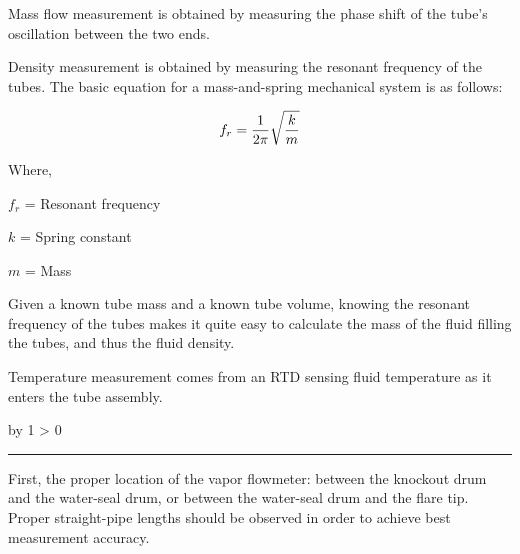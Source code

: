 \documentclass[12pt,a4paper]{article}
\def\svar{
           \advance\answnum by 1
           \ifnum \answnum > 0
                \hrule
                \vskip 3pt
                \leftline{Svar \the\answnum}
                \vskip 3pt \fi}
\begin{document}
\vskip 10pt

Mass flow measurement is obtained by measuring the phase shift of the tube's oscillation between the two ends.  

Density measurement is obtained by measuring the resonant frequency of the tubes.  The basic equation for a mass-and-spring mechanical system is as follows:

$$f_r = {1 \over 2 \pi} \sqrt{k \over m}$$

\noindent
Where,

$f_r$ = Resonant frequency

$k$ = Spring constant

$m$ = Mass 

\vskip 10pt

Given a known tube mass and a known tube volume, knowing the resonant frequency of the tubes makes it quite easy to calculate the mass of the fluid filling the tubes, and thus the fluid density.  

Temperature measurement comes from an RTD sensing fluid temperature as it enters the tube assembly.  

\vskip 10pt \filbreak 
\svar{} 

First, the proper location of the vapor flowmeter: between the knockout drum and the water-seal drum, or between the water-seal drum and the flare tip.  Proper straight-pipe lengths should be observed in order to achieve best measurement accuracy.

\vskip 10pt
\end{document}
